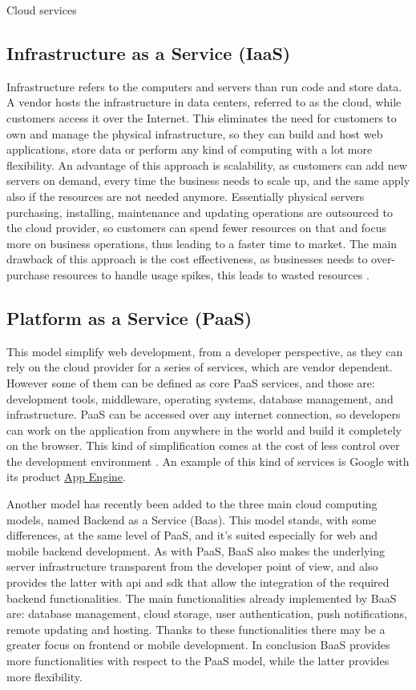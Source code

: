 \begin{chapter}{Cloud services}
    \subsection{Infrastructure as a Service (IaaS)}
    Infrastructure refers to the computers and servers than run code and store data.
    A vendor hosts the infrastructure in data centers, referred to as the cloud,
    while customers access it over the Internet. This eliminates the need for customers
    to own and manage the physical infrastructure, so they can build and host web
    applications, store data or perform any kind of computing with a lot more flexibility.
    An advantage of this approach is scalability, as customers can add new servers
    on demand, every time the business needs to scale up, and the same apply also
    if the resources are not needed anymore. Essentially physical servers purchasing,
    installing, maintenance and updating operations are outsourced to the cloud
    provider, so customers can spend fewer resources on that and focus more on business
    operations, thus leading to a faster time to market. The main drawback of this
    approach is the cost effectiveness, as businesses needs to over-purchase resources
    to handle usage spikes, this leads to wasted resources \cite{iaas}.

    \subsection{Platform as a Service (PaaS)}
    This model simplify web development, from a developer perspective, as they can
    rely on the cloud provider for a series of services, which are vendor dependent.
    However some of them can be defined as core PaaS services, and those are: development
    tools, middleware, operating systems, database management, and infrastructure.
    PaaS can be accessed over any internet connection, so developers can work on
    the application from anywhere in the world and build it completely on the browser.
    This kind of simplification comes at the cost of less control over the development
    environment \cite{paas}. An example of this kind of services is Google with
    its product \href{https://cloud.google.com/appengine}{App Engine}.

    \smallskip
    Another model has recently been added to the three main cloud computing models,
    named Backend as a Service (Baas). This model stands, with some differences,
    at the same level of PaaS, and it's suited especially for web and mobile backend
    development. As with PaaS, BaaS also makes the underlying server infrastructure
    transparent from the developer point of view, and also provides the latter with
    api and sdk that allow the integration of the required backend functionalities.
    The main functionalities already implemented by BaaS are: database management,
    cloud storage, user authentication, push notifications, remote updating and hosting.
    Thanks to these functionalities there may be a greater focus on frontend or mobile
    development.
    In conclusion BaaS provides more functionalities with respect to the PaaS model,
    while the latter provides more flexibility.


\end{chapter}
